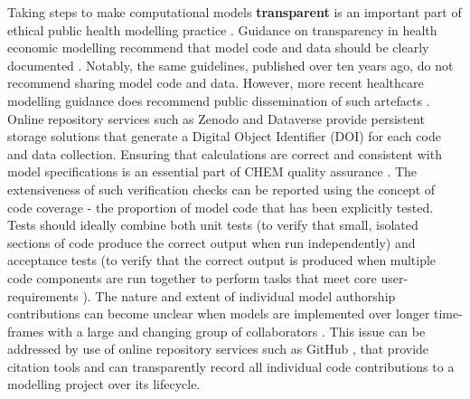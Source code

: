 \documentclass[sn-vancouver,Numbered,pdflatex]{sn-jnl}
\theoremstyle{remark}
\theoremstyle{definition}
\begin{document}
Taking steps to make computational models \textbf{transparent} is an important part of ethical public health modelling practice \citep{10.3389/fpubh.2017.00068}. Guidance on transparency in health economic modelling recommend that model code and data should be clearly documented \citep{Eddy2012}. Notably, the same guidelines, published over ten years ago, do not recommend sharing model code and data. However, more recent healthcare modelling guidance does recommend public dissemination of such artefacts \citep{Erdemir2020}. Online repository services such as Zenodo \citep{Zenodo2013} and Dataverse \citep{Dataverse2007} provide persistent storage solutions that generate a Digital Object Identifier (DOI) for each code and data collection. Ensuring that calculations are correct and consistent with model specifications is an essential part of CHEM quality assurance \citep{techver2019}. The extensiveness of such verification checks can be reported using the concept of code coverage \citep{ERICWONG2010188} - the proportion of model code that has been explicitly tested. Tests should ideally combine both unit tests (to verify that small, isolated sections of code produce the correct output when run independently) and acceptance tests (to verify that the correct output is produced when multiple code components are run together to perform tasks that meet core user-requirements \citep{martin2003agile}). The nature and extent of individual model authorship contributions can become unclear when models are implemented over longer time-frames with a large and changing group of collaborators \citep{thompson2022escape}. This issue can be addressed by use of online repository services such as GitHub \citep{github2007}, that provide citation tools and can transparently record all individual code contributions to a modelling project over its lifecycle.
\end{document}
